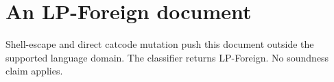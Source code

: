 \documentclass{article}
\begin{document}
\section{An LP-Foreign document}

Shell-escape and direct catcode mutation push this document outside
the supported language domain. The classifier returns LP-Foreign.
No soundness claim applies.
\end{document}
